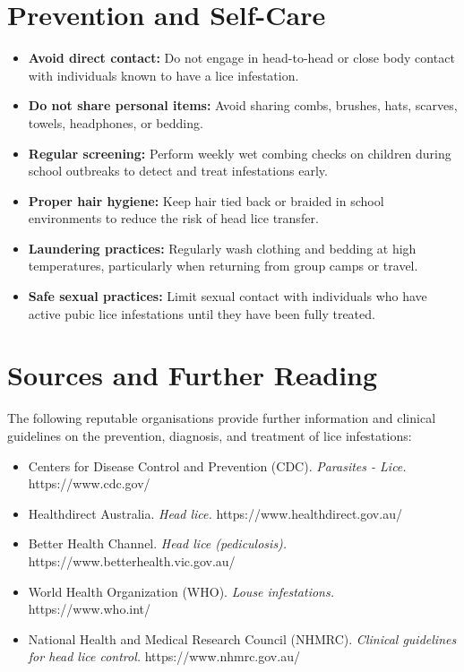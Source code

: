 \section*{Prevention and Self-Care}
\begin{itemize}
    \item \textbf{Avoid direct contact:} Do not engage in head-to-head or close body contact with individuals known to have a lice infestation.
    \item \textbf{Do not share personal items:} Avoid sharing combs, brushes, hats, scarves, towels, headphones, or bedding.
    \item \textbf{Regular screening:} Perform weekly wet combing checks on children during school outbreaks to detect and treat infestations early.
    \item \textbf{Proper hair hygiene:} Keep hair tied back or braided in school environments to reduce the risk of head lice transfer.
    \item \textbf{Laundering practices:} Regularly wash clothing and bedding at high temperatures, particularly when returning from group camps or travel.
    \item \textbf{Safe sexual practices:} Limit sexual contact with individuals who have active pubic lice infestations until they have been fully treated.
\end{itemize}

\section*{Sources and Further Reading}
The following reputable organisations provide further information and clinical guidelines on the prevention, diagnosis, and treatment of lice infestations:
\begin{itemize}
    \item Centers for Disease Control and Prevention (CDC). \textit{Parasites - Lice.} https://www.cdc.gov/
    \item Healthdirect Australia. \textit{Head lice.} https://www.healthdirect.gov.au/
    \item Better Health Channel. \textit{Head lice (pediculosis).} https://www.betterhealth.vic.gov.au/
    \item World Health Organization (WHO). \textit{Louse infestations.} https://www.who.int/
    \item National Health and Medical Research Council (NHMRC). \textit{Clinical guidelines for head lice control.} https://www.nhmrc.gov.au/
\end{itemize}

